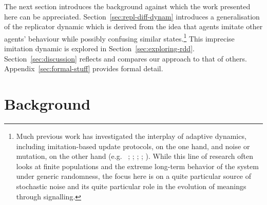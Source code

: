 \documentclass[11pt,english]{article}
\numberwithin{equation}{section}
\newcommand{\citealtbjps}[1]{\citeauthor{#1} \citeyear{#1}}
\newcommand{\citepbjps}[1]{(\citeauthor{#1} \citeyear{#1})}
\begin{document}

The next section introduces the background against which the work presented here can be
appreciated. Section~\ref{sec:repl-diff-dynam} introduces a generalisation of the replicator
dynamic which is derived from the idea that agents imitate other agents' behaviour while
possibly confusing similar states.\footnote{Much previous work has investigated the interplay
  of adaptive dynamics, including imitation-based update protocols, on the one hand, and noise
  or mutation, on the other hand (e.g.~\citealtbjps{FosterYoung1990:Stochastic-Evol};
  \citealtbjps{FudenbergHarris1992:Evolutionary-Dy};
  \citealtbjps{KandoriMailath1993:Learning-Mutati}; \citealtbjps{Young1993:The-Evolution-o};
  \citealtbjps{FudenbergImhof2006:Imitation-Proce}). While this line of research often looks at
  finite populations and the extreme long-term behavior of the system under generic randomness,
  the focus here is on a quite particular source of stochastic noise and its quite particular
  role in the evolution of meanings through signalling.}  This imprecise imitation dynamic is
explored in Section~\ref{sec:exploring-rdd}. Section~\ref{sec:discussion} reflects and compares
our approach to that of others. Appendix~\ref{sec:formal-stuff} provides formal detail.

\section{Background}
\label{sec:background}

\end{document}
